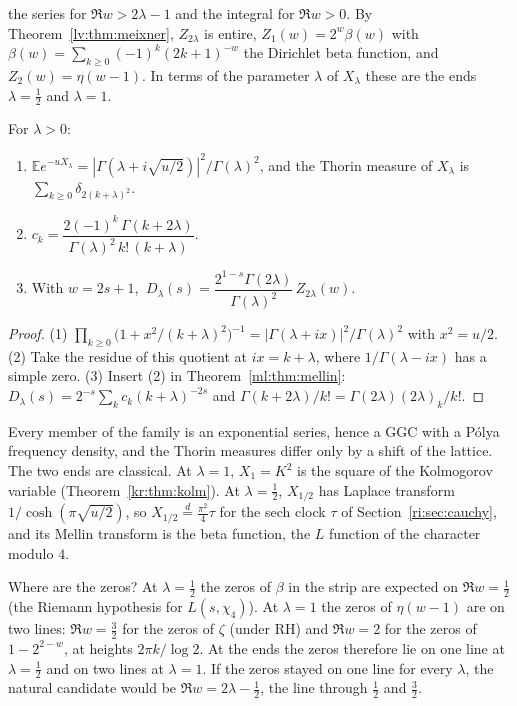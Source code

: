 the series for $\Re w>2\lambda-1$ and the integral for $\Re w>0$. By Theorem~\ref{lv:thm:meixner}, $Z_{2\lambda}$ is entire, $Z_{1}(w)=2^w\beta(w)$ with $\beta(w)=\sum_{k\ge0}(-1)^k(2k+1)^{-w}$ the Dirichlet beta function, and $Z_{2}(w)=\eta(w-1)$. In terms of the parameter $\lambda$ of $X_\lambda$ these are the ends $\lambda=\frac12$ and $\lambda=1$.
\begin{theorem}\label{ml:thm:family}
For $\lambda>0$:
\begin{enumerate}
\item $\mathbb Ee^{-uX_\lambda}=|\Gamma(\lambda+i\sqrt{u/2})|^2/\Gamma(\lambda)^2$, and the Thorin measure of $X_\lambda$ is $\sum_{k\ge0}\delta_{2(k+\lambda)^2}$.
\item $c_k=\dfrac{2(-1)^k\,\Gamma(k+2\lambda)}{\Gamma(\lambda)^2\,k!\,(k+\lambda)}$.
\item With $w=2s+1$, $\ D_\lambda(s)=\dfrac{2^{1-s}\Gamma(2\lambda)}{\Gamma(\lambda)^2}\,Z_{2\lambda}(w)$.
\end{enumerate}
\end{theorem}
\begin{proof}
(1) $\prod_{k\ge0}\big(1+x^2/(k+\lambda)^2\big)^{-1}=|\Gamma(\lambda+ix)|^2/\Gamma(\lambda)^2$ with $x^2=u/2$. (2) Take the residue of this quotient at $ix=k+\lambda$, where $1/\Gamma(\lambda-ix)$ has a simple zero. (3) Insert (2) in Theorem~\ref{ml:thm:mellin}: $D_\lambda(s)=2^{-s}\sum_kc_k(k+\lambda)^{-2s}$ and $\Gamma(k+2\lambda)/k!=\Gamma(2\lambda)(2\lambda)_k/k!$.
\end{proof}


Every member of the family is an exponential series, hence a GGC with a P\'olya frequency density, and the Thorin measures differ only by a shift of the lattice. The two ends are classical. At $\lambda=1$, $X_1=K^2$ is the square of the Kolmogorov variable (Theorem~\ref{kr:thm:kolm}). At $\lambda=\frac12$, $X_{1/2}$ has Laplace transform $1/\cosh(\pi\sqrt{u/2})$, so $X_{1/2}\overset d=\frac{\pi^2}4\tau$ for the sech clock $\tau$ of Section~\ref{ri:sec:cauchy}, and its Mellin transform is the beta function, the $L$ function of the character modulo $4$.

Where are the zeros? At $\lambda=\frac12$ the zeros of $\beta$ in the strip are expected on $\Re w=\frac12$ (the Riemann hypothesis for $L(s,\chi_4)$). At $\lambda=1$ the zeros of $\eta(w-1)$ are on two lines: $\Re w=\frac32$ for the zeros of $\zeta$ (under RH) and $\Re w=2$ for the zeros of $1-2^{2-w}$, at heights $2\pi k/\log2$. At the ends the zeros therefore lie on one line at $\lambda=\frac12$ and on two lines at $\lambda=1$. If the zeros stayed on one line for every $\lambda$, the natural candidate would be $\Re w=2\lambda-\frac12$, the line through $\frac12$ and $\frac32$.

